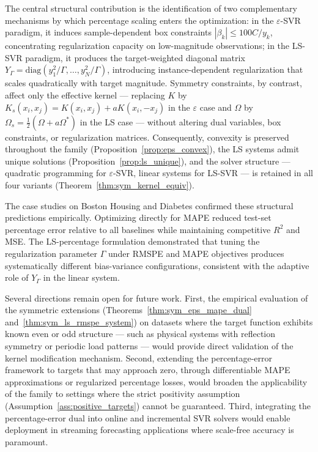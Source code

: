 \documentclass[mathematics,article,submit,pdftex,moreauthors]{Definitions/mdpi}
\begin{document}
The central structural contribution is the identification of
two complementary mechanisms by which percentage scaling enters
the optimization:
in the $\varepsilon$-SVR paradigm, it induces sample-dependent
box constraints $|\beta_k| \leq 100C/y_k$, concentrating
regularization capacity on low-magnitude observations;
in the LS-SVR paradigm, it produces the target-weighted diagonal
matrix $Y_\Gamma = \mathrm{diag}(y_1^2/\Gamma, \ldots, y_N^2/\Gamma)$,
introducing instance-dependent regularization that scales
quadratically with target magnitude.
Symmetry constraints, by contrast, affect only the effective
kernel --- replacing $K$ by $K_s(x_i,x_j) = K(x_i,x_j) + aK(x_i,-x_j)$
in the $\varepsilon$ case and $\Omega$ by $\Omega_s = \frac{1}{2}(\Omega + a\Omega^*)$
in the LS case --- without altering dual variables, box constraints,
or regularization matrices.
Consequently, convexity is preserved throughout the family
(Proposition~\ref{prop:eps_convex}), the LS systems admit unique
solutions (Proposition~\ref{prop:ls_unique}), and the solver
structure --- quadratic programming for $\varepsilon$-SVR,
linear systems for LS-SVR --- is retained in all four variants
(Theorem~\ref{thm:sym_kernel_equiv}).

The case studies on Boston Housing and Diabetes confirmed
these structural predictions empirically.
Optimizing directly for MAPE reduced test-set percentage error
relative to all baselines while maintaining competitive $R^2$
and MSE.
The LS-percentage formulation demonstrated that tuning the
regularization parameter $\Gamma$ under RMSPE and MAPE objectives
produces systematically different bias-variance configurations,
consistent with the adaptive role of $Y_\Gamma$ in the linear system.

Several directions remain open for future work.
First, the empirical evaluation of the symmetric extensions
(Theorems~\ref{thm:sym_eps_mape_dual}
and~\ref{thm:sym_ls_rmspe_system}) on datasets where the
target function exhibits known even or odd structure --- such
as physical systems with reflection symmetry or periodic load
patterns --- would provide direct validation of the kernel
modification mechanism.
Second, extending the percentage-error framework to targets
that may approach zero, through differentiable MAPE
approximations or regularized percentage losses, would broaden
the applicability of the family to settings where the
strict positivity assumption (Assumption~\ref{ass:positive_targets})
cannot be guaranteed.
Third, integrating the percentage-error dual into online and
incremental SVR solvers would enable deployment in streaming
forecasting applications where scale-free accuracy is paramount.
\end{document}
